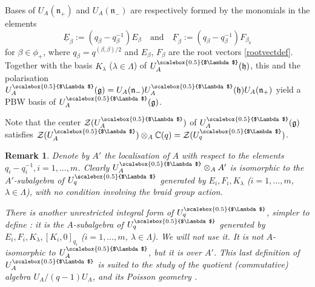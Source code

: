 \documentclass[11pt]{amsart}
\newtheorem{remark}[teo]{Remark}
\newcommand{\Lam}{{\scalebox{0.5}{$\Lambda$}}}
\begin{document}
Bases of $U_A(\mathfrak{n}_+)$ and $U_A(\mathfrak{n}_-)$ are respectively formed by the monomials in the elements
\begin{equation}\label{defRootVectorsUnrestricted}
\underline{E}_{\beta}:=(q_\beta-q_\beta^{-1})E_{\beta} \quad \text{and} \quad \underline{F}_{\beta}:=(q_\beta-q_\beta^{-1})F_{\beta_k}
\end{equation}
for $\beta \in \phi_+$, where $q_\beta = q^{(\beta,\beta)/2}$ and $E_{\beta}$, $F_{\beta}$ are the root vectors \eqref{rootvectdef}. Together with the basis $K_\lambda$ ($\lambda\in \Lambda$) of $U_A^\Lam(\mathfrak{h})$, this and the polarisation $U_A^\Lam(\mathfrak{g})=U_A(\mathfrak{n}_-)U_A^\Lam(\mathfrak{h})U_A(\mathfrak{n}_+)$ yield a PBW basis of $U_A^\Lam(\mathfrak{g})$. 
\smallskip

Note that the center $\mathcal Z(U_A^\Lam)$ of $U_A^\Lam(\mathfrak{g})$ satisfies $\mathcal Z(U_A^\Lam)\otimes_A {\mathbb C}(q)=\mathcal Z(U_q^\Lam)$.

\begin{remark}
{\rm Denote by $A'$ the localisation of $A$ with respect to the elements  $q_i-q_i^{-1}, i=1,\ldots,m$. Clearly $U_A^\Lam\otimes_A A'$ is isomorphic to the $A'$-subalgebra of $U_q^\Lam$  generated by $E_i, F_i , K_{\lambda}$ ($i=1,\ldots, m$, $\lambda \in \Lambda$), with no condition involving the braid group action.

There is another unrestricted integral form of $U_q^\Lam$, simpler to define \cite{DCK}: it is the $A$-subalgebra of $U_q^\Lam$ generated by  $E_i, F_i, K_\lambda, [K_i, 0]_{q_i}$ ($i=1,\ldots,m$, $\lambda \in \Lambda$). We will not use it. It is not $A$-isomorphic to $U_A^\Lam$, but it is over $A'$. This last definition of $U_A^\Lam$ is suited to the study of the quotient (commutative) algebra $U_A/(q-1)U_A$, and its Poisson geometry \cite[\S 12.4, \S 14, \S 15]{DCP}.}
\end{remark}
\end{document}
